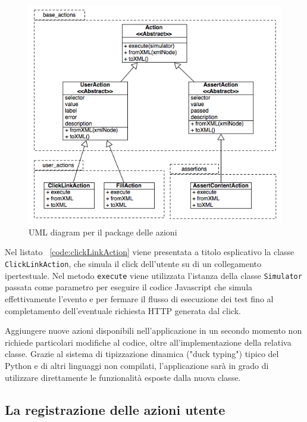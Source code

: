 \documentclass[12pt]{toptesi}
\begin{document}
\begin{figure}[htbp]
\begin{center}
\includegraphics[width=\textwidth]{images/uml_actions.png}
\caption{UML diagram per il package delle azioni}
\label{fig:actionUML}
\end{center}
\end{figure}

Nel listato ~\ref{code:clickLinkAction} viene presentata a titolo esplicativo la classe \verb|ClickLinkAction|, che simula il click dell'utente su di un collegamento ipertestuale. Nel metodo \verb|execute| viene utilizzata l'istanza della classe \verb|Simulator| passata come parametro per eseguire il codice Javascript che simula effettivamente l'evento e per fermare il flusso di esecuzione dei test fino al completamento dell'eventuale richiesta HTTP generata dal click.



Aggiungere nuove azioni disponibili nell'applicazione in un secondo momento non richiede particolari modifiche al codice, oltre all'implementazione della relativa classe. Grazie al sistema di tipizzazione dinamica ("duck typing") tipico del Python e di altri linguaggi non compilati, l'applicazione sarà in grado di utilizzare direttamente le funzionalità esposte dalla nuova classe.

\subsection{La registrazione delle azioni utente}
\end{document}

